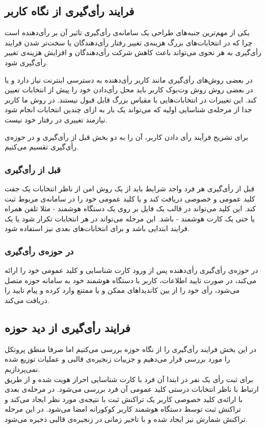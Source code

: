 \subsection{فرایند رأی‌گیری از نگاه کاربر}
یکی از مهم‌ترین جنبه‌های طراحی یک سامانه‌ی رأی‌گیری تاثیر آن بر رأی‌دهنده است چرا که در انتخابات‌های بزرگ هزینه‌ی تغییر رفتار رأی‌دهندگان یا سخت‌تر شدن فرایند رأی‌گیری به هر نحوی می‌تواند باعث کاهش شرکت رأی‌دهندگان و افزایش هزینه‌ی تغییر رأی‌گیری شود.
\par
در بعضی روش‌های رأی‌گیری مانند  کاربر رأی‌دهنده به دسترسی اینترنت نیاز دارد و یا در بعضی روش‌ روش وت‌بوک کاربر باید محل رأی‌دادن خود را پیش از انتخابات تعیین کند. این تغییرات در انتخابات‌هایی با مقیاس بزرگ قابل قبول نیستند. در روش ما کاربر جدا از مرحله‌ی شناسایی اولیه که می‌تواند یک بار به ازای چندین انتخابات انجام شود نیازمند تغییری در رفتار خود نیست. 
\par
برای تشریح فرآیند رأی‌ دادن کاربر، آن را به دو بخش قبل از رأی‌گیری و در حوزه‌ی رأی‌گیری تقسیم می‌کنیم. 
\subsubsection{قبل از رأی‌گیری}
قبل از رأی‌گیری هر فرد واجد شرایط باید از یک روش امن از ناظر انتخابات یک جفت کلید عمومی و خصوصی دریافت کند و یا کلید عمومی خود را در سامانه‌ی مربوط ثبت کند. این کلید می‌تواند در قالب یک فایل بر روی یک دستگاه هوشمند - مثلا تلفن همراه یا حتی یک کارت هوشمند - باشد. این مرحله  می‌تواند در هر انتخابات تکرار شود یا یک فرایند ابتدایی باشد و برای انتخابات‌های بعدی نیز استفاده شود. 
\subsubsection{در حوزه‌ی رأی‌گیری}
در حوزه‌ی رأی‌گیری رأی‌دهنده پس از ورود کارت شناسایی و کلید عمومی خود را ارائه می‌کند، در صورت تایید اطلاعات، کاربر با دستگاه هوشمند خود به سامانه‌ حوزه متصل می‌شود، رأی‌ خود را از بین‌ کاندیدا‌های ممکن و یا ممتنع وارد کرده و پیام تایید را دریافت می‌کند. 
\subsection{فرایند رأی‌گیری از دید حوزه‌}
در این بخش فرایند رأی‌گیری را از نگاه حوزه‌ بررسی می‌کنیم اما صرفا منطق پروتکل را مورد بررسی قرار می‌دهیم و جزییات زنجیره‌ی قالبی و عملیات توزیع شده نمی‌پردازیم. 
\\
برای ثبت رأی یک‌ نفر در ابتدا آن فرد با کارت شناسایی احراز هویت شده و از طریق ارتباط با ناظر انتخابات درستی کلید عمومی آن فرد بررسی می‌شود. در مرحله‌ی بعدی با ارائه‌ی کلید خصوصی کاربر یک تراکنش ثبت با نتیجه‌ی مورد نظر ایجاد می‌کند و تراکنش ثبت توسط دستگاه هوشمند کاربر کوکورانه امضا می‌شود. در این مرحله تراکنش شمارش نیز ایجاد شده و با تاخیر زمانی در زنجیره‌ی قالبی ذخیره می‌شود.


